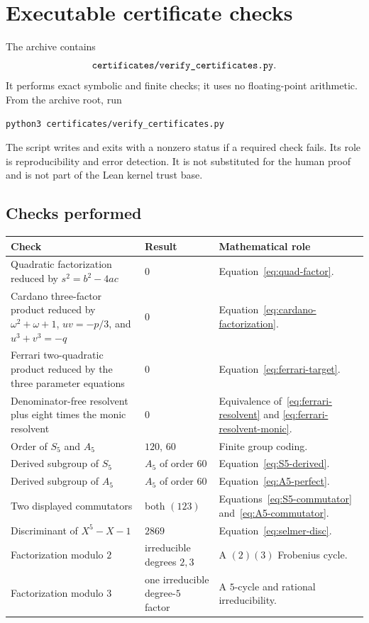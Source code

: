 \section{Executable certificate checks}
\label{sec:checks}

The archive contains
\[
 \code{certificates/verify_certificates.py}.
\]
It performs exact symbolic and finite checks; it uses no floating-point
arithmetic.  From the archive root, run

\begin{lstlisting}[style=lean,language={}]
python3 certificates/verify_certificates.py
\end{lstlisting}

The script writes  and exits with a nonzero
status if a required check fails.  Its role is reproducibility and error
detection.  It is not substituted for the human proof and is not part of the
Lean kernel trust base.

\subsection{Checks performed}

\begin{longtable}{p{}p{}p{}}
\toprule
Check & Result & Mathematical role\\
\midrule
\endhead
Quadratic factorization reduced by
$s^2=b^2-4ac$ & $0$ & Equation~\eqref{eq:quad-factor}.\\
Cardano three-factor product reduced by
$\omega^2+\omega+1$, $uv=-p/3$, and $u^3+v^3=-q$ & $0$ &
Equation~\eqref{eq:cardano-factorization}.\\
Ferrari two-quadratic product reduced by the three parameter equations & $0$ &
Equation~\eqref{eq:ferrari-target}.\\
Denominator-free resolvent plus eight times the monic resolvent & $0$ &
Equivalence of~\eqref{eq:ferrari-resolvent} and
\eqref{eq:ferrari-resolvent-monic}.\\
Order of $S_5$ and $A_5$ & $120$, $60$ & Finite group coding.\\
Derived subgroup of $S_5$ & $A_5$ of order $60$ &
Equation~\eqref{eq:S5-derived}.\\
Derived subgroup of $A_5$ & $A_5$ of order $60$ &
Equation~\eqref{eq:A5-perfect}.\\
Two displayed commutators & both $(123)$ &
Equations~\eqref{eq:S5-commutator} and~\eqref{eq:A5-commutator}.\\
Discriminant of $X^5-X-1$ & $2869$ &
Equation~\eqref{eq:selmer-disc}.\\
Factorization modulo $2$ & irreducible degrees $2,3$ &
A $(2)(3)$ Frobenius cycle.\\
Factorization modulo $3$ & one irreducible degree-$5$ factor &
A $5$-cycle and rational irreducibility.\\
\bottomrule
\end{longtable}

